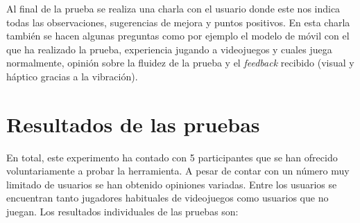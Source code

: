 Al final de la prueba se realiza una charla con el usuario donde este nos indica todas las observaciones, sugerencias de mejora y puntos positivos. En esta charla tambi\'en se hacen algunas preguntas como por ejemplo el modelo de m\'ovil con el que ha realizado la prueba, experiencia jugando a videojuegos y cuales juega normalmente, opini\'on sobre la fluidez de la prueba y el \textit{feedback} recibido (visual y h\'aptico gracias a la vibraci\'on).

\section{Resultados de las pruebas}

En total, este experimento ha contado con 5 participantes que se han ofrecido voluntariamente a probar la herramienta. A pesar de contar con un n\'umero muy limitado de usuarios se han obtenido opiniones variadas. Entre los usuarios se encuentran tanto jugadores habituales de videojuegos como usuarios que no juegan. Los resultados individuales de las pruebas son:

